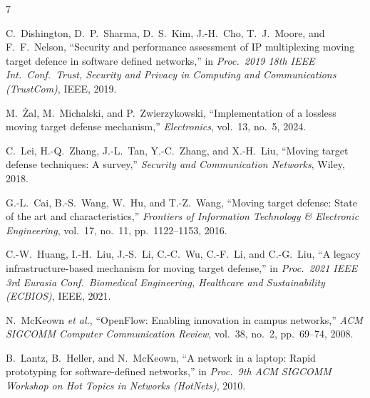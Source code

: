 \documentclass[conference]{IEEEtran}
\begin{document}
\begin{thebibliography}{7}

C.~Dishington, D.~P.~Sharma, D.~S.~Kim, J.-H.~Cho, T.~J.~Moore, and F.~F.~Nelson, ``Security and performance assessment of IP multiplexing moving target defence in software defined networks,'' in \emph{Proc.\ 2019 18th IEEE Int.\ Conf.\ Trust, Security and Privacy in Computing and Communications (TrustCom)}, IEEE, 2019.

M.~\.{Z}al, M.~Michalski, and P.~Zwierzykowski, ``Implementation of a lossless moving target defense mechanism,'' \emph{Electronics}, vol.~13, no.~5, 2024.

C.~Lei, H.-Q.~Zhang, J.-L.~Tan, Y.-C.~Zhang, and X.-H.~Liu, ``Moving target defense techniques: A survey,'' \emph{Security and Communication Networks}, Wiley, 2018.

G.-L.~Cai, B.-S.~Wang, W.~Hu, and T.-Z.~Wang, ``Moving target defense: State of the art and characteristics,'' \emph{Frontiers of Information Technology \& Electronic Engineering}, vol.~17, no.~11, pp.~1122--1153, 2016.

C.-W.~Huang, I.-H.~Liu, J.-S.~Li, C.-C.~Wu, C.-F.~Li, and C.-G.~Liu, ``A legacy infrastructure-based mechanism for moving target defense,'' in \emph{Proc.\ 2021 IEEE 3rd Eurasia Conf.\ Biomedical Engineering, Healthcare and Sustainability (ECBIOS)}, IEEE, 2021.

N.~McKeown \emph{et al.}, ``OpenFlow: Enabling innovation in campus networks,'' \emph{ACM SIGCOMM Computer Communication Review}, vol.~38, no.~2, pp.~69--74, 2008.

B.~Lantz, B.~Heller, and N.~McKeown, ``A network in a laptop: Rapid prototyping for software-defined networks,'' in \emph{Proc.\ 9th ACM SIGCOMM Workshop on Hot Topics in Networks (HotNets)}, 2010.

\end{thebibliography}

\balance
\end{document}

